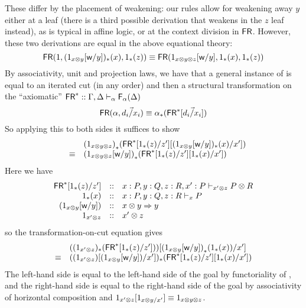 These differ by the placement of weakening: our rules allow for
weakening away $y$ either at a leaf (there is a third possible
derivation that weakens in the $z$ leaf instead), as is typical in
affine logic, or at the context division in $\mathsf{FR}$.  However, these two
derivations are equal in the above equational theory:
\[
\mathsf{FR}(1,(1_{x \otimes y}[\mathsf{w}/y])_*(x),1_*(z))
\equiv
\mathsf{FR}(1_{x \otimes y \otimes z}[\mathsf{w}/y],1_*(x),1_*(z))
\]
By associativity, unit and projection laws, we have that a general
instance of \FR\/ is equal to an iterated cut (in any order) and then a
structural transformation on the ``axiomatic'' $\mathsf{FR}^* ::
\Gamma,\Delta \vdash_{\alpha} \mathsf{F}_{\alpha}(\Delta)$
\[
\mathsf{FR}(\alpha,\vec{d_i/x_i}) \equiv \alpha_*(\mathsf{FR}^*[\vec{d_i/x_i}])
\]
So applying this to both sides it suffices to show
\[
\begin{array}{rcl}
& &  {(1_{x \otimes y \otimes z})}_*(\mathsf{FR}^*[1_*(z)/z'][(1_{x \otimes y}[\mathsf{w}/y])_*(x)/x'])\\
& \equiv & {(1_{x \otimes y \otimes z}[\mathsf{w}/y])}_*(\mathsf{FR}^*[1_*(z)/z'][1_*(x)/x']) 
\end{array}
\]
Here we have
\[
\begin{array}{rcl}
\mathsf{FR}^*[1_*(z)/z'] & :: & x:P,y:Q,z:R,x':P \vdash_{x' \otimes z} P \otimes R\\
1_*(x) & :: & x:P,y:Q,z:R \vdash_{x} P\\
{(1_{x \otimes y}[\mathsf{w}/y])} & :: & x \otimes y \Rightarrow y\\
1_{x'\otimes z} & :: & x' \otimes z
\end{array}
\]
so the transformation-on-cut equation gives
\[
\begin{array}{rl}
     & (({1_{x'\otimes z}})_*(\mathsf{FR}^*[1_*(z)/z']))[{(1_{x \otimes y}[\mathsf{w}/y])}_*(1_*(x))/x']\\
 \equiv &  (({1_{x'\otimes z}})[(1_{x \otimes y}[\mathsf{w}/y])/x'])  _*(\mathsf{FR}^*[1_*(z)/z'][1_*(x)/x'])
\end{array}
\]
The left-hand side is equal to the left-hand side of the goal by
functoriality of \Trd{-}{-}, and the right-hand side is equal to the
right-hand side of the goal by associativity of horizontal composition
and $1_{x' \otimes z}[1_{x \otimes y/x'}] \equiv 1_{x \otimes y \otimes
  z}$.  

